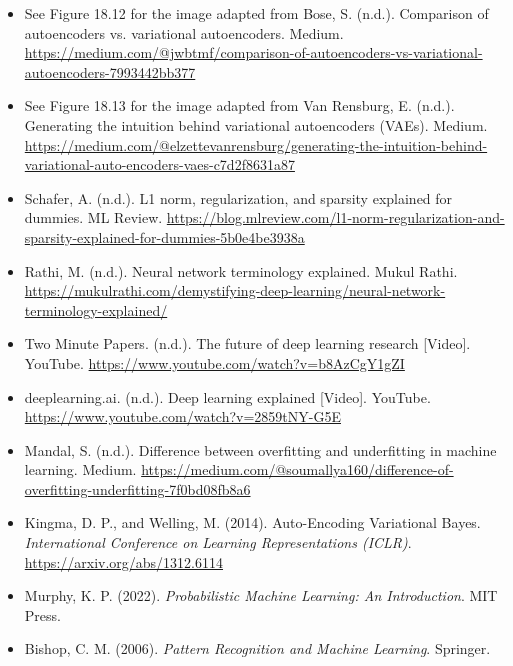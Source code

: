 \documentclass{article}
\begin{document}
\begin{itemize}
\item See Figure 18.12 for the image adapted from Bose, S. (n.d.). Comparison of autoencoders vs. variational autoencoders. Medium. \url{https://medium.com/@jwbtmf/comparison-of-autoencoders-vs-variational-autoencoders-7993442bb377}

\item See Figure 18.13 for the image adapted from Van Rensburg, E. (n.d.). Generating the intuition behind variational autoencoders (VAEs). Medium. \url{https://medium.com/@elzettevanrensburg/generating-the-intuition-behind-variational-auto-encoders-vaes-c7d2f8631a87}

\item Schafer, A. (n.d.). L1 norm, regularization, and sparsity explained for dummies. ML Review. \url{https://blog.mlreview.com/l1-norm-regularization-and-sparsity-explained-for-dummies-5b0e4be3938a}

\item Rathi, M. (n.d.). Neural network terminology explained. Mukul Rathi. \url{https://mukulrathi.com/demystifying-deep-learning/neural-network-terminology-explained/}

\item Two Minute Papers. (n.d.). The future of deep learning research [Video]. YouTube. \url{https://www.youtube.com/watch?v=b8AzCgY1gZI}

\item deeplearning.ai. (n.d.). Deep learning explained [Video]. YouTube. \url{https://www.youtube.com/watch?v=2859tNY-G5E}

\item Mandal, S. (n.d.). Difference between overfitting and underfitting in machine learning. Medium. \url{https://medium.com/@soumallya160/difference-of-overfitting-underfitting-7f0bd08fb8a6}

\item Kingma, D. P., and Welling, M. (2014). Auto-Encoding Variational Bayes. \textit{International Conference on Learning Representations (ICLR)}. \url{https://arxiv.org/abs/1312.6114}

\item Murphy, K. P. (2022). \textit{Probabilistic Machine Learning: An Introduction}. MIT Press.

\item Bishop, C. M. (2006). \textit{Pattern Recognition and Machine Learning}. Springer.

\end{itemize}
\end{document}
